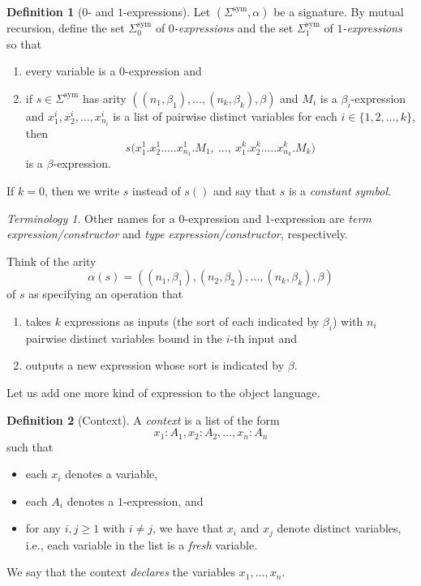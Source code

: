 \documentclass[10pt,letterpaper,cm]{nupset}
\theoremstyle{definition}
\newtheorem{definition}{Definition}[subsection]
\theoremstyle{theorem}
\theoremstyle{remark}
\newtheorem*{term}{Terminology}
\DeclareMathOperator{\sym}{sym}
\newcommand{\0}{\mathbf{0}}
\newcommand{\1}{\mathbf{1}}
\newcommand{\2}{\mathbf{2}}
\newcommand{\bi}{\begin{itemize}}
\newcommand{\ei}{\end{itemize}}
\newcommand{\be}{\begin{enumerate}}
\newcommand{\ee}{\end{enumerate}}
\begin{document}
\begin{definition}[$0$- and $1$-expressions]
Let $\left(\Sigma^{\sym}, \alpha\right)$ be a signature. By mutual recursion, define the set $\Sigma_0^{\sym}$ of \textit{$0$-expressions} and the set $\Sigma_1^{\sym}$ of \textit{$1$-expressions} so that
\be[label =(\roman*)]
\item every variable is a $0$-expression and
\item if $s\in \Sigma^{\sym}$ has arity $\left(\left(n_{1}, \beta_{1}\right), \ldots,\left(n_{k}, \beta_{k}\right), \beta\right)$ and $M_i$ is a $\beta_i$-expression and $x^i_1, x^i_2, \ldots, x^i_{n_i}$ is a list of pairwise distinct variables for each $i \in \{1, 2, \ldots, k\}$, then 
$$
s\big(x^1_1.x^1_2.\ldots.x^1_{n_1}.M_{1},\ \ldots,\  x^k_1.x^k_2.\ldots.x^k_{n_k}.M_{k}\big)
$$
is a $\beta$-expression.
\ee
If $k=0$, then we write $s$ instead of $s()$ and say that $s$ is a \textit{constant symbol}.
\end{definition}

\begin{term}
Other names for a $0$-expression and $1$-expression are \textit{term expression/constructor} and \textit{type expression/constructor}, respectively.
\end{term}

\medskip

Think of the arity $$\alpha(s) = \left(\left(n_{1}, \beta_{1}\right),\left(n_{2}, \beta_{2}\right), \ldots,\left(n_{k}, \beta_{k}\right), \beta\right)$$ of $s$ as specifying an operation that 
\be[label=(\alph*)]
\item
takes $k$ expressions as inputs (the sort of each indicated by $\beta_i$) with $n_i$ pairwise distinct variables bound in the $i$-th input  and 
\item outputs a new expression whose sort is indicated by $\beta$. 
\ee

\medskip

Let us add one more kind of expression to the object language.

\begin{definition}[Context]
A \textit{context} is a list of the form 
\[
 x_{1} : A_{1}, x_{2} : A_{2},\ldots, x_{n} : A_{n} 
\] such that 
\bi
\item each $x_i$ denotes a variable,
\item each $A_i$ denotes a $1$-expression, and
 \item for any $i, j\geq 1$ with $i\ne j$, we have that $x_i$ and $x_j$ denote distinct variables, i.e., each variable in the list is a \textit{fresh} variable.
 \ei
  We say that the context \textit{declares} the variables $x_1, \ldots, x_n$.
\end{definition}
\end{document}
